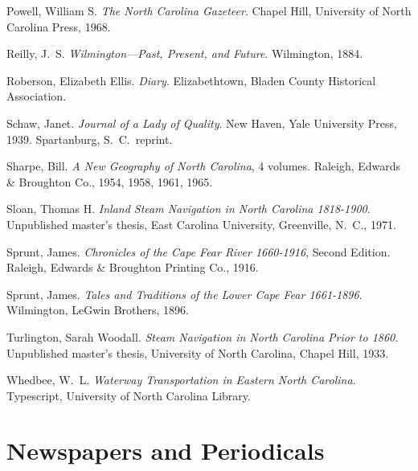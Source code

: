 \documentclass[11pt, a5paper, openright]{book}
\begin{document}
\begin{thebibliography}{99}
  Powell, William S.  \emph{The North Carolina Gazeteer}.  Chapel Hill,
  University of North Carolina Press, 1968.

  Reilly, J.~S.  \emph{Wilmington---Past, Present, and Future}.  Wilmington,
  1884.

  Roberson, Elizabeth Ellis.  \emph{Diary}.  Elizabethtown, Bladen County Historical Association.

  Schaw, Janet.  \emph{Journal of a Lady of Quality}.  New Haven, Yale
  University Press, 1939.  Spartanburg, S.~C.~reprint.

  Sharpe, Bill.  \emph{A New Geography of North Carolina}, 4 volumes.  Raleigh,
  Edwards \& Broughton Co., 1954, 1958, 1961, 1965.

  Sloan, Thomas H.  \emph{Inland Steam Navigation in North Carolina 1818-1900}. %
  Unpublished master's thesis, East Carolina University, Greenville, N.~C., 1971.

  Sprunt, James.  \emph{Chronicles of the Cape Fear River 1660-1916}, Second %
  Edition.  Raleigh, Edwards \& Broughton Printing Co., 1916.

  Sprunt, James.  \emph{Tales and Traditions of the Lower Cape Fear 1661-1896}. %
  Wilmington, LeGwin Brothers, 1896.

  Turlington, Sarah Woodall.  \emph{Steam Navigation in North Carolina Prior
    to 1860}.  Unpublished master's thesis, University of North Carolina, Chapel
  Hill, 1933.

  Whedbee, W.~L.  \emph{Waterway Transportation in Eastern North Carolina}.
  Typescript, University of North Carolina Library.


\section*{Newspapers and Periodicals}


\end{thebibliography}
\end{document}
